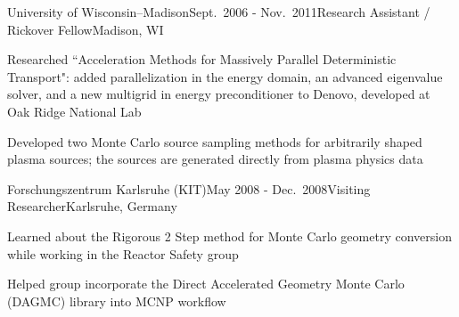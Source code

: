 \clearpage
\begin{rSubsection}{University of Wisconsin--Madison}{Sept.\ 2006 - Nov.\ 2011}{Research Assistant / Rickover Fellow}{Madison, WI}
\item Researched ``Acceleration Methods for Massively Parallel Deterministic Transport": added parallelization in the energy domain, an advanced eigenvalue solver, and a new multigrid in energy preconditioner to Denovo, developed at Oak Ridge National Lab
\item Developed two Monte Carlo source sampling methods for arbitrarily shaped plasma sources; the sources are generated directly from plasma physics data
\end{rSubsection}




\begin{rSubsection}{Forschungszentrum Karlsruhe (KIT)}{May 2008 - Dec.\ 2008}{Visiting Researcher}{Karlsruhe, Germany}
\item Learned about the Rigorous 2 Step method for Monte Carlo geometry conversion while working in the Reactor Safety group
\item Helped group incorporate the Direct Accelerated Geometry Monte Carlo (DAGMC) library into MCNP workflow
\end{rSubsection}


